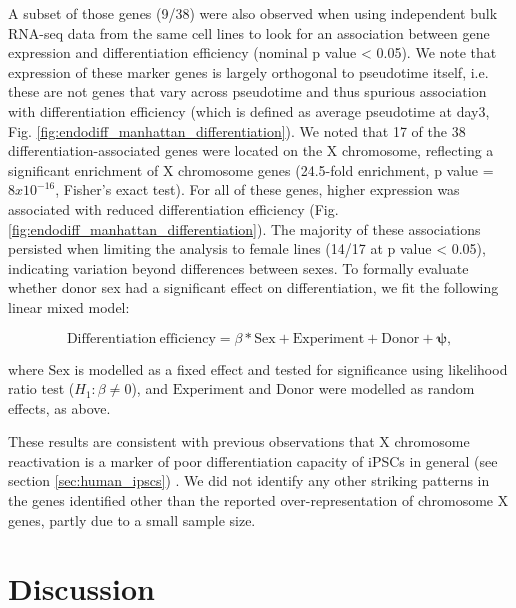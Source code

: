 A subset of those genes (9/38) were also observed when using independent bulk RNA-seq data from the same cell lines to look for an association between gene expression and differentiation efficiency (nominal p value < 0.05). 
We note that expression of these marker genes is largely orthogonal to pseudotime itself, i.e. these are not genes that vary across pseudotime and thus spurious association with differentiation efficiency (which is defined as average pseudotime at day3, Fig. \ref{fig:endodiff_manhattan_differentiation}). 
We noted that 17 of the 38 differentiation-associated genes were located on the X chromosome, reflecting a significant enrichment of X chromosome genes (24.5-fold enrichment, p value = $8x10^{-16}$, Fisher’s exact test). 
For all of these genes, higher expression was associated with reduced differentiation efficiency (Fig. \ref{fig:endodiff_manhattan_differentiation}). 
The majority of these associations persisted when limiting the analysis to female lines (14/17 at p value < 0.05), indicating variation beyond differences between sexes. 
To formally evaluate whether donor sex had a significant effect on differentiation, we fit the following linear mixed model:

\begin{equation}
    \mathrm{Differentiation} \ \mathrm{efficiency} = \beta*\mathrm{Sex} + \mathrm{Experiment} + \mathrm{Donor} + \boldsymbol{\psi},
\end{equation}

where $\mathrm{Sex}$ is modelled as a fixed effect and tested for significance using likelihood ratio test ($H_1: \beta \neq 0$), and $\mathrm{Experiment}$ and $\mathrm{Donor}$ were modelled as random effects, as above.

These results are consistent with previous observations that X chromosome reactivation is a marker of poor differentiation capacity of iPSCs in general (see section \ref{sec:human_ipscs}) \cite{anguera2012molecular, patel2017human}. 
We did not identify any other striking patterns in the genes identified other than the reported over-representation of chromosome X genes, partly due to a small sample size.



\section{Discussion}


